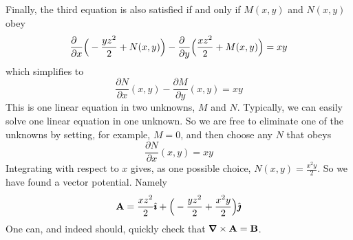 \begin{eg}
Finally, the third equation is also satisfied
if and only if $M(x,y)$ and $N(x,y)$ obey
\begin{equation*}
\frac{\partial\hfill}{\partial x}\Big(-\frac{yz^2}{2} + N(x,y)\Big) 
-\frac{\partial\hfill}{\partial y}\Big(\frac{xz^2}{2} + M(x,y)\Big)=xy
\end{equation*}
which simplifies to
\begin{equation*}
\frac{\partial N}{\partial x}(x,y) -\frac{\partial M}{\partial y}(x,y) =xy
\end{equation*}
This is one linear equation in two unknowns, $M$ and $N$. 
Typically, we can easily solve one linear equation in one unknown. 
So we are free to eliminate one of the unknowns by setting, for example, 
$M=0$, and then choose any $N$ that obeys
\begin{equation*}
\frac{\partial N}{\partial x}(x,y) = xy
\end{equation*}
Integrating with respect to $x$ gives, as one possible choice, $N(x,y) = \frac{x^2y}{2}$. So we have found a vector potential. Namely
\begin{equation*}
\mathbf{A} = \frac{xz^2}{2} \hat{\pmb{\imath}} +\Big(-\frac{yz^2}{2} +  \frac{x^2y}{2}\Big)\hat{\pmb{\jmath}}
\end{equation*}
One can, and indeed should, quickly check that $\vnabla\times\vA=\vB$.
\end{eg}

